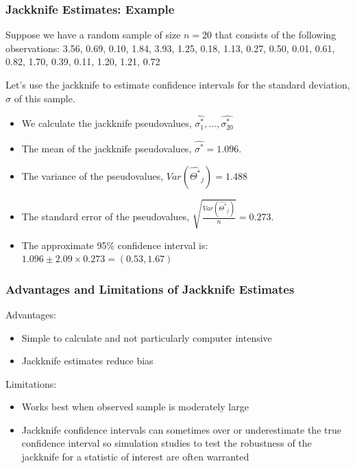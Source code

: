 \documentclass{beamer}
\begin{document}
\begin{frame}
  \frametitle{Jackknife Estimates: Example}

Suppose we have a random sample of size $n=20$ that consists of the following observations: 3.56, 0.69, 0.10, 1.84, 3.93, 1.25, 0.18, 1.13, 0.27, 0.50, 0.01, 0.61, 0.82, 1.70, 0.39, 0.11, 1.20, 1.21, 0.72
\medskip

Let's use the jackknife to estimate confidence intervals for the standard deviation, $\sigma$ of this sample.

\begin{itemize}
    \item We calculate the jackknife pseudovalues, $\widehat{\sigma^*_1}, \ldots, \widehat{\sigma^*_20}$
    \item The mean of the jackknife pseudovalues, $\widehat{\sigma^*} = 1.096$.
    \item The variance of the pseudovalues, $Var(\widehat{\Theta^*}_j) = 1.488$
    \item The standard error of the pseudovalues, $\sqrt{\frac{Var(\widehat{\Theta^*}_j)}{n}} = 0.273$.
    \item The approximate 95\% confidence interval is: $1.096 \pm 2.09 \times 0.273 = (0.53, 1.67)$

\end{itemize}



\end{frame}

\begin{frame}
  \frametitle{Advantages and Limitations of Jackknife Estimates}

Advantages:
\begin{itemize}
    \item Simple to calculate and not particularly computer intensive
    \item Jackknife estimates reduce bias
\end{itemize}

Limitations:
\begin{itemize}
    \item Works best when observed sample is moderately large
    \item Jackknife confidence intervals can sometimes over or underestimate the true confidence interval so simulation studies to test the robustness of the jackknife for a statistic of interest are often warranted
\end{itemize}

\end{frame}
\end{document}
